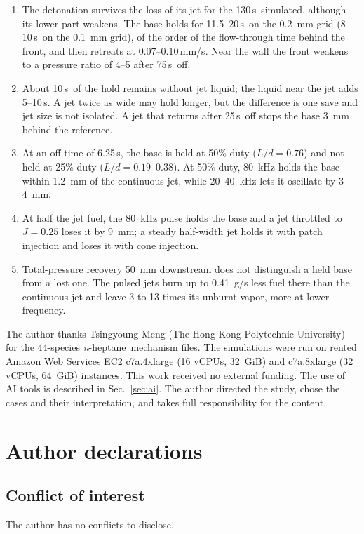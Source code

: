 \documentclass[aip,pof,preprint,amsmath,amssymb]{revtex4-2}
\newcommand{\us}{\,\textmu s}
\newcommand{\mmus}{\,mm/\textmu s}
\newcommand{\nh}{\textit{n}-heptane}
\begin{document}
\begin{enumerate}
\item The detonation survives the loss of its jet for the 130\us\ simulated, although its lower part weakens. The base holds for 11.5--20\us\ on the 0.2~mm grid (8--10\us\ on the 0.1~mm grid), of the order of the flow-through time behind the front, and then retreats at 0.07--0.10\mmus. Near the wall the front weakens to a pressure ratio of 4--5 after 75\us\ off.
\item About 10\us\ of the hold remains without jet liquid; the liquid near the jet adds 5--10\us. A jet twice as wide may hold longer, but the difference is one save and jet size is not isolated. A jet that returns after 25\us\ off stops the base 3~mm behind the reference.
\item At an off-time of 6.25\us, the base is held at 50\% duty ($L/d = 0.76$) and not held at 25\% duty ($L/d = 0.19$--0.38). At 50\% duty, 80~kHz holds the base within 1.2~mm of the continuous jet, while 20--40~kHz lets it oscillate by 3--4~mm.
\item At half the jet fuel, the 80~kHz pulse holds the base and a jet throttled to $J = 0.25$ loses it by 9~mm; a steady half-width jet holds it with patch injection and loses it with cone injection.
\item Total-pressure recovery 50~mm downstream does not distinguish a held base from a lost one. The pulsed jets burn up to 0.41~g/s less fuel there than the continuous jet and leave 3 to 13 times its unburnt vapor, more at lower frequency.
\end{enumerate}

\begin{acknowledgments}
The author thanks Tsingyoung Meng (The Hong Kong Polytechnic University) for the 44-species \nh\ mechanism files. The simulations were run on rented Amazon Web Services EC2 c7a.4xlarge (16 vCPUs, 32~GiB) and c7a.8xlarge (32 vCPUs, 64~GiB) instances. This work received no external funding. The use of AI tools is described in Sec.~\ref{sec:ai}. The author directed the study, chose the cases and their interpretation, and takes full responsibility for the content.
\end{acknowledgments}

\section*{Author declarations}
\subsection*{Conflict of interest}
The author has no conflicts to disclose.
\end{document}
